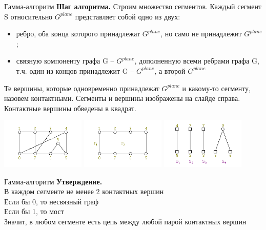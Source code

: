 \documentclass[10pt]{beamer}
\begin{document}
\begin{frame}[fragile]{Гамма-алгоритм}
\textbf{Шаг алгоритма.} Строим множество сегментов. Каждый сегмент S относительно $G^{plane}$ представляет собой одно из двух:
            \begin{itemize}
                \item ребро, оба конца которого принадлежат $G^{plane}$, но само не принадлежит $G^{plane}$;
                \item связную компоненту графа G – $G^{plane}$, дополненную всеми ребрами графа G, т.ч. один из концов принадлежит G – $G^{plane}$, а второй $G^{plane}$
            \end{itemize}
Те вершины, которые одновременно принадлежат $G^{plane}$ и какому-то сегменту, назовем контактными. Сегменты и вершины изображены на слайде справа. Контактные вершины обведены в квадрат.
\begin{center}
    \includegraphics[width=4cm]{Term_2/Source/images/5_gamma_1.png}
    \includegraphics[width=4cm]{Term_2/Source/images/5_gamma_2.png}
    \includegraphics[width=4cm]{Term_2/Source/images/5_gamma_3.png}
\end{center}
\end{frame}

\begin{frame}[fragile]{Гамма-алгоритм}
\textbf{Утверждение.}\\
В каждом сегменте не менее 2 контактных вершин\\
Если бы 0, то несвязный граф\\
Если бы 1, то мост\\
Значит, в любом сегменте есть цепь между любой парой контактных вершин
\end{frame}
\end{document}
